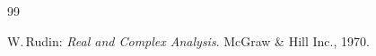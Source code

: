 \documentclass[11pt,twoside]{article}
\begin{document}
\newpage
\thispagestyle{empty}

\begin{thebibliography}{99}
\begin{small}

  W.\,Rudin:
\textit{Real and Complex Analysis}.
McGraw \& Hill Inc., 1970.

\end{small}
\end{thebibliography}

\end{document}
